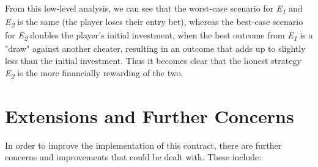 \documentclass[a4paper, twoside]{article}
\begin{document}
From this low-level analysis, we can see that the worst-case scenario for \textit{E\textsubscript{1}} and \textit{E\textsubscript{2}} is the same (the player loses their entry bet), whereas the best-case scenario for \textit{E\textsubscript{2}} doubles the player's initial investment, when the best outcome from \textit{E\textsubscript{1}} is a "draw" against another cheater, resulting in an outcome that adds up to slightly less than the initial investment. Thus it becomes clear that the honest strategy \textit{E\textsubscript{2}} is the more financially rewarding of the two.

\section{Extensions and Further Concerns}

In order to improve the implementation of this contract, there are further concerns and improvements that could be dealt with. These include:
\end{document}
